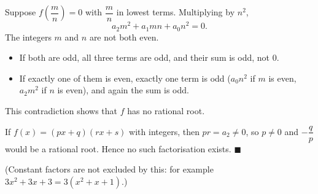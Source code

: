 Suppose $f\!\left(\dfrac mn\right)=0$ with $\dfrac mn$ in lowest terms. Multiplying by $n^2$,
\[a_2m^2+a_1mn+a_0n^2=0.\]
The integers $m$ and $n$ are not both even.
\begin{itemize}
\item If both are odd, all three terms are odd, and their sum is odd, not $0$.
\item If exactly one of them is even, exactly one term is odd ($a_0n^2$ if $m$ is even, $a_2m^2$ if $n$ is even), and again the sum is odd.
\end{itemize}
This contradiction shows that $f$ has no rational root.

If $f(x)=(px+q)(rx+s)$ with integers, then $pr=a_2\ne0$, so $p\ne0$ and $-\dfrac qp$ would be a rational root. Hence no such factorisation exists. $\blacksquare$

(Constant factors are not excluded by this: for example $3x^2+3x+3=3(x^2+x+1)$.)
